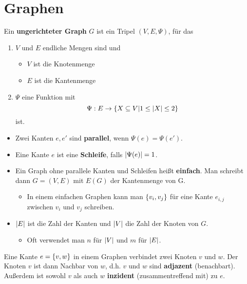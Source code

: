 \section{Graphen}
	\begin{definition}
		Ein \textbf{ungerichteter Graph} $G$ ist ein Tripel $(V, E, \Psi)$, für das
		\begin{enumerate}
			\item $V$ und $E$ endliche Mengen sind und
			\begin{itemize}
				\item $V$ ist die Knotenmenge
				\item $E$ ist die Kantenmenge
			\end{itemize}
			\item $\Psi$ eine Funktion mit
			\begin{equation*}
				\Psi : E \to \{X \subseteq V \vert 1 \le \vert X \vert \le 2\}
			\end{equation*}
			ist.\\
		\end{enumerate}
		\begin{itemize}
				\item Zwei Kanten $e, e'$ sind \textbf{parallel}, wenn $\Psi(e) = \Psi(e')$.
				\item Eine Kante $e$ ist eine \textbf{Schleife}, falls $\vert \Psi(e) \vert = 1$.
				\item Ein Graph ohne parallele Kanten und Schleifen heißt \textbf{einfach}. Man schreibt dann $G = (V, E)$ mit $E(G)$ der Kantenmenge von G.
				\begin{itemize}[label=$\hookrightarrow$]
					\item  In einem einfachen Graphen kann man $\{v_i, v_j\}$ für eine Kante $e_{i,j}$ zwischen $v_i$ und $v_j$ schreiben.
				\end{itemize}
				\item $\vert E \vert$ ist die Zahl der Kanten und $\vert V \vert$ die Zahl der Knoten von $G$.
				\begin{itemize}[label=$\hookrightarrow$]
					\item Oft verwendet man $n$ für $\vert V \vert$ und $m$ für $\vert E \vert$.
				\end{itemize}
			\end{itemize}
	\end{definition}
	\begin{definition}
		Eine Kante $e = \{v, w\}$ in einem Graphen verbindet zwei Knoten $v$ und $w$. Der Knoten $v$ ist dann Nachbar von $w$, d.h. $v$ und $w$ sind \textbf{adjazent} (\dq benachbart\dq). Außerdem ist sowohl $v$ als auch $w$ \textbf{inzident} (\dq zusammentreffend mit\dq) zu $e$.
	\end{definition}
